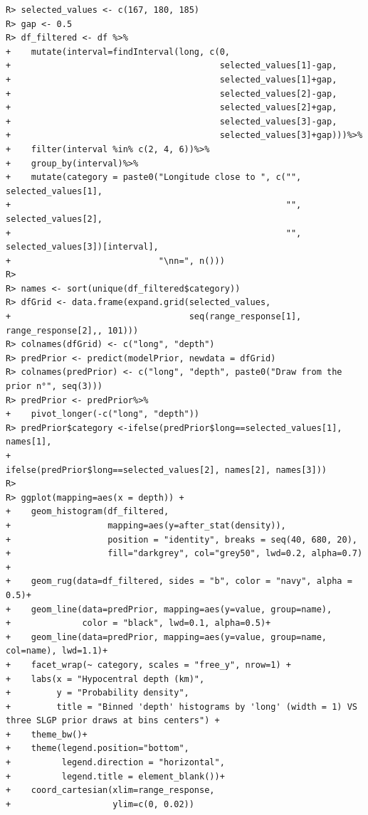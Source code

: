\documentclass[
]{article}
\begin{document}
\begin{verbatim}
R> selected_values <- c(167, 180, 185)
R> gap <- 0.5
R> df_filtered <- df %>%
+    mutate(interval=findInterval(long, c(0, 
+                                         selected_values[1]-gap, 
+                                         selected_values[1]+gap, 
+                                         selected_values[2]-gap, 
+                                         selected_values[2]+gap, 
+                                         selected_values[3]-gap, 
+                                         selected_values[3]+gap)))%>%
+    filter(interval %in% c(2, 4, 6))%>%
+    group_by(interval)%>%
+    mutate(category = paste0("Longitude close to ", c("", selected_values[1],
+                                                      "", selected_values[2],
+                                                      "", selected_values[3])[interval], 
+                             "\nn=", n()))
R> 
R> names <- sort(unique(df_filtered$category))
R> dfGrid <- data.frame(expand.grid(selected_values, 
+                                   seq(range_response[1], range_response[2],, 101)))
R> colnames(dfGrid) <- c("long", "depth")
R> predPrior <- predict(modelPrior, newdata = dfGrid)
R> colnames(predPrior) <- c("long", "depth", paste0("Draw from the prior n°", seq(3)))
R> predPrior <- predPrior%>%
+    pivot_longer(-c("long", "depth"))
R> predPrior$category <-ifelse(predPrior$long==selected_values[1], names[1],
+                              ifelse(predPrior$long==selected_values[2], names[2], names[3]))
R> 
R> ggplot(mapping=aes(x = depth)) +
+    geom_histogram(df_filtered,
+                   mapping=aes(y=after_stat(density)),
+                   position = "identity", breaks = seq(40, 680, 20),
+                   fill="darkgrey", col="grey50", lwd=0.2, alpha=0.7) +
+    geom_rug(data=df_filtered, sides = "b", color = "navy", alpha = 0.5)+
+    geom_line(data=predPrior, mapping=aes(y=value, group=name), 
+              color = "black", lwd=0.1, alpha=0.5)+
+    geom_line(data=predPrior, mapping=aes(y=value, group=name, col=name), lwd=1.1)+
+    facet_wrap(~ category, scales = "free_y", nrow=1) +
+    labs(x = "Hypocentral depth (km)",
+         y = "Probability density", 
+         title = "Binned 'depth' histograms by 'long' (width = 1) VS three SLGP prior draws at bins centers") +
+    theme_bw()+
+    theme(legend.position="bottom",
+          legend.direction = "horizontal",
+          legend.title = element_blank())+
+    coord_cartesian(xlim=range_response,
+                    ylim=c(0, 0.02))
\end{verbatim}
\end{document}
